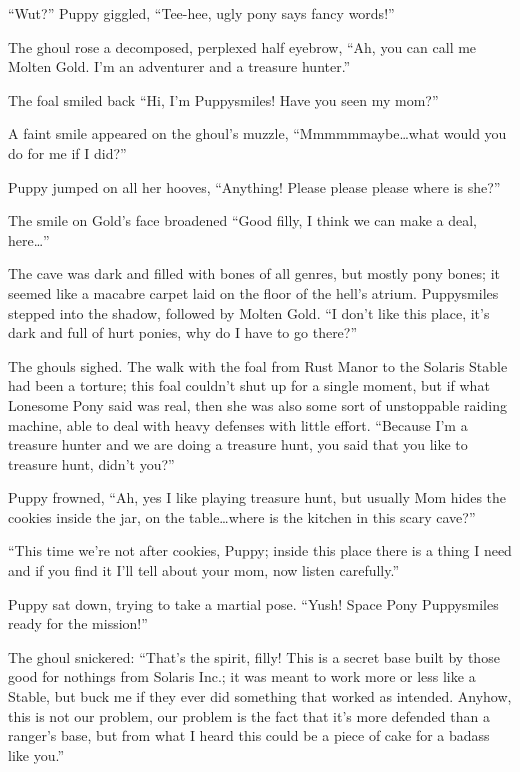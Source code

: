``Wut?'' Puppy giggled, ``Tee-hee, ugly pony says fancy words!''

The ghoul rose a decomposed, perplexed half eyebrow, ``Ah, you can call me Molten Gold. I'm an adventurer and a treasure hunter.''

The foal smiled back ``Hi, I'm Puppysmiles! Have you seen my mom?''

A faint smile appeared on the ghoul's muzzle, ``Mmmmmmaybe\dots what would you do for me if I did?''

Puppy jumped on all her hooves, ``Anything! Please please please where is she?''

The smile on Gold's face broadened ``Good filly, I think we can make a deal, here\dots''

\horizonline


The cave was dark and filled with bones of all genres, but mostly pony bones; it seemed like a macabre carpet laid on the floor of the hell's atrium. Puppysmiles stepped into the shadow, followed by Molten Gold. ``I don't like this place, it's dark and full of hurt ponies, why do I have to go there?''

The ghouls sighed. The walk with the foal from Rust Manor to the Solaris Stable had been a torture; this foal couldn't shut up for a single moment, but if what Lonesome Pony said was real, then she was also some sort of unstoppable raiding machine, able to deal with heavy defenses with little effort. ``Because I'm a treasure hunter and we are doing a treasure hunt, you said that you like to treasure hunt, didn't you?''

Puppy frowned, ``Ah, yes I like playing treasure hunt, but usually Mom hides the cookies inside the jar, on the table\dots where is the kitchen in this scary cave?''

``This time we're not after cookies, Puppy; inside this place there is a thing I need and if you find it I'll tell about your mom, now listen carefully.''

Puppy sat down, trying to take a martial pose. ``Yush! Space Pony Puppysmiles ready for the mission!''

The ghoul snickered: ``That's the spirit, filly! This is a secret base built by those good for nothings from Solaris Inc.; it was meant to work more or less like a Stable, but buck me if they ever did something that worked as intended. Anyhow, this is not our problem, our problem is the fact that it's more defended than a ranger's base, but from what I heard this could be a piece of cake for a badass like you.''

